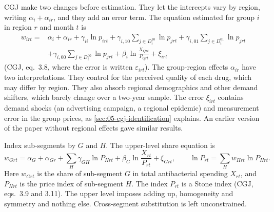 CGJ make two changes before estimation. They let the intercepts vary by region,
writing $\alpha_i + \alpha_{ir}$, and they add an error term. The equation estimated for group $i$ in region $r$ and
month $t$ is
\begin{equation}\label{eq:05-cgj-lower-est}
\begin{split}
w_{irt} = {}& \alpha_i + \alpha_{ir} + \gamma_{ii}\ln p_{irt} + \gamma_{i,10}\sum_{j\in D_i^{10}}\ln p_{jrt}
+ \gamma_{i,01}\sum_{j\in D_i^{01}}\ln p_{jrt} \\
&+ \gamma_{i,00}\sum_{j\in D_i^{00}}\ln p_{jrt} + \beta_i\ln\frac{X_{Qrt}}{P_{Qrt}} + \xi_{irt}
\end{split}
\end{equation}
(CGJ, eq.~3.8, where the error is written $\varepsilon_{irt}$). The group-region effects $\alpha_{ir}$ have two
interpretations. They control for the perceived quality of each drug, which may differ by region. They also absorb
regional demographics and other demand shifters, which barely change over a two-year sample. The error $\xi_{irt}$
contains demand shocks (an advertising campaign, a regional epidemic) and measurement error in the group prices, as
\cref{sec:05-cgj-identification} explains. An earlier version of the paper without regional effects gave similar
results.

 Index sub-segments by $G$ and $H$. The upper-level share equation is
\begin{equation}\label{eq:05-cgj-upper}
w_{Grt} = \alpha_G + \alpha_{Gr} + \sum_{H}\gamma_{GH}\ln P_{Hrt} + \beta_G\ln\frac{X_{rt}}{P_{rt}} + \xi_{Grt},
\qquad \ln P_{rt} = \sum_{H} w_{Hrt}\ln P_{Hrt}.
\end{equation}
Here $w_{Grt}$ is the share of sub-segment $G$ in total antibacterial spending $X_{rt}$, and $P_{Hrt}$ is the price
index of sub-segment $H$. The index $P_{rt}$ is a Stone index (CGJ, eqs.~3.9 and 3.11). The upper level imposes adding up,
homogeneity and symmetry and nothing else. Cross-segment substitution is left unconstrained.

